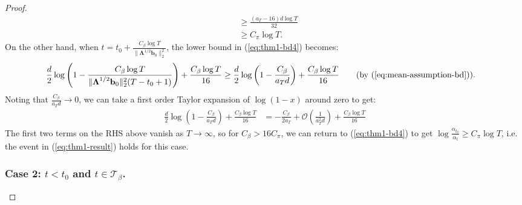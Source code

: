 \begin{proof}
\begin{align*}
    &\geq \frac{(a_T-16)d\log T}{32}
    \tag{$T \geq T-t_0+1$} \\
    &\geq C_\pi \log T. \tag{$a_T \geq 32C_\pi + 16$}
\end{align*}
On the other hand, when $t = t_0 + \frac{C_\beta\log T}{\lVert\boldsymbol{\Lambda}^{1/2}\mathbf{b}_0\rVert_2^2}$, the lower bound in (\ref{eq:thm1-bd4}) becomes: 
\begin{align*}
    \frac{d}{2}\log\left(1 - \frac{C_\beta\log T}{\lVert\boldsymbol{\Lambda}^{1/2}\mathbf{b}_0\rVert_2^2(T-t_0+1)}\right) +\frac{C_\beta\log T}{16} &\geq \frac{d}{2}\log\left(1 - \frac{C_\beta}{a_Td}\right) +\frac{C_\beta\log T}{16} \tag{by (\ref{eq:mean-assumption-bd})}.
\end{align*}
Noting that $\frac{C_\beta}{a_Td} \to 0$, we can take a first order Taylor expansion of $\log(1-x)$ around zero to get:
\begin{align*}
    \frac{d}{2}\log\left(1 - \frac{C_\beta}{a_Td}\right) +\frac{C_\beta\log T}{16} &= -\frac{C_\beta}{2a_T} + \mathcal{O}\left(\frac{1}{a^2_Td}\right) +\frac{C_\beta\log T}{16} 
\end{align*}
The first two terms on the RHS above vanish as $T\to\infty$, so for $C_\beta > 16 C_\pi$, we can return to (\ref{eq:thm1-bd4}) to get $\log \frac{\alpha_{t_0}}{\alpha_t} \geq C_\pi\log T$, i.e. the event in (\ref{eq:thm1-result}) holds for this case.

\subsubsection*{Case 2: $t < t_0$ and $t\in\mathcal{T}_\beta$.}


\end{proof}
